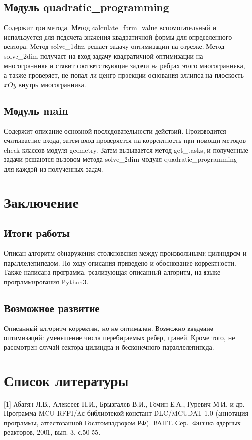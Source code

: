 \documentclass[pdftex,ptm,12pt,a4paper]{report}
\begin{document}
\section{Модуль quadratic\_programming}
Содержит три метода.
Метод calculate\_form\_value вспомогательный и используется для подсчета значения квадратичной формы для определенного вектора.
Метод solve\_1dim решает задачу оптимизации на отрезке.
Метод solve\_2dim получает на вход задачу квадратичной оптимизации на многограннике
и ставит соответствующие задачи на ребрах этого многогранника, а также проверяет, не попал ли центр проекции основания эллипса
на плоскость $xOy$ внутрь многогранника.

\section{Модуль main}
Содержит описание основной последовательности действий.
Производится считываение входа, затем вход проверяется на корректность при помощи
методов check классов модуля geometry.
Затем вызывается метод get\_tasks, и полученные задачи решаются вызовом метода solve\_2dim
модуля quadratic\_programming для каждой из полученных задач.


\chapter{Заключение}
\section{Итоги работы}
  Описан алгоритм обнаружения столкновения между произвольными цилиндром и параллелепипедом.
  По ходу описания приведено и обоснование корректности.
  Также написана программа, реализующая описанный алгоритм, на языке программирования Python3.
\section{Возможное развитие}
  Описанный алгоритм корректен, но не оптимален.
  Возможно введение оптимизаций: уменьшение числа перебираемых ребер, граней.
  Кроме того, не рассмотрен случай сектора цилиндра и бесконечного параллелепипеда.
\clearpage

\chapter{Список литературы}
[1] Абагян Л.В., Алексеев Н.И., Брызгалов В.И., Гомин Е.А., Гуревич М.И. и др. Программа MCU-RFFI/Aс библиотекой констант DLC/MCUDAT-1.0 (аннотация
 программы, аттестованной Госатомнадзором РФ). ВАНТ. Сер.: Физика ядерных реакторов, 2001, вып. 3, с.50-55.
\end{document}
